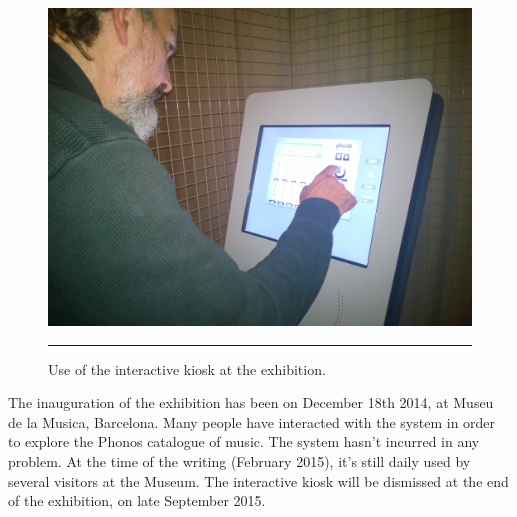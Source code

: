 \begin{figure}[htbp]
\begin{center}
\includegraphics[scale=0.1]{Figures/kiosk2.jpg}
    \rule{20em}{0.5pt}
  \caption[Interactive kiosk at the exhibition]{Use of the interactive kiosk at the exhibition.}
  \label{fig:kiosk}
\end{center}
\end{figure}
The inauguration of the exhibition has been on December 18th 2014, at Museu de la Musica, Barcelona. Many people have interacted with the system in order to explore the Phonos catalogue of music. The system hasn't incurred in any problem. At the time of the writing (February 2015), it's still daily used by several visitors at the Museum. The interactive kiosk will be dismissed at the end of the exhibition, on late September 2015.\\


